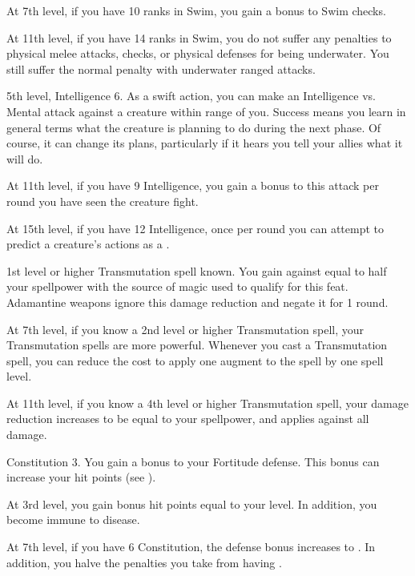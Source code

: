     At 7th level, if you have 10 ranks in Swim, you gain a  bonus to Swim checks.

    At 11th level, if you have 14 ranks in Swim, you do not suffer any penalties to physical melee attacks, checks, or physical defenses for being underwater.
    You still suffer the normal penalty with underwater ranged attacks.

    \featpres 5th level, Intelligence 6.
    \featben As a swift action, you can make an Intelligence vs. Mental attack against a creature within \rngmed range of you.
    Success means you learn in general terms what the creature is planning to do during the next phase.
    Of course, it can change its plans, particularly if it hears you tell your allies what it will do.

    At 11th level, if you have 9 Intelligence, you gain a  bonus to this attack per round you have seen the creature fight.

    At 15th level, if you have 12 Intelligence, once per round you can attempt to predict a creature's actions as a .

    \featpre 1st level or higher Transmutation spell known.
    \featben You gain  against  equal to half your spellpower with the source of magic used to qualify for this feat.
    Adamantine weapons ignore this damage reduction and negate it for 1 round.

    At 7th level, if you know a 2nd level or higher Transmutation spell, your Transmutation spells are more powerful.
    Whenever you cast a Transmutation spell, you can reduce the cost to apply one augment to the spell by one spell level.

    At 11th level, if you know a 4th level or higher Transmutation spell, your damage reduction increases to be equal to your spellpower, and applies against all damage.

    \featpre Constitution 3.
    \featben You gain a  bonus to your Fortitude defense.
    This bonus can increase your hit points (see ).

    At 3rd level, you gain bonus hit points equal to your level.
    In addition, you become immune to disease.

    At 7th level, if you have 6 Constitution, the defense bonus increases to .
    In addition, you halve the penalties you take from having .

